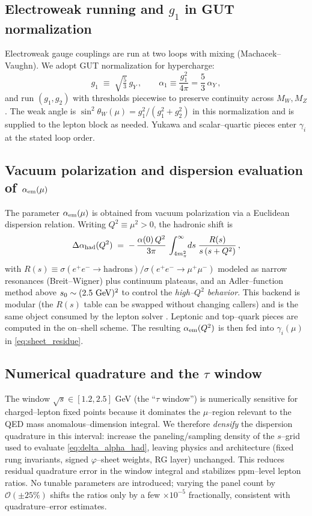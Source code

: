 \documentclass[%
  amsmath,amssymb,
  aps,
 prb,
 floatfix, showkeys
 ]{revtex4-2}
\begin{document}
 \subsection{Electroweak running and $g_1$ in GUT normalization}   %
 \label{subsec:ew_running}
 Electroweak gauge couplings are run at two loops with mixing (Machacek–Vaughn). We adopt GUT normalization for hypercharge:
 \[
   g_1 \;\equiv\; \sqrt{\tfrac{5}{3}}\,g_Y\,,\qquad \alpha_1 \equiv \frac{g_1^2}{4\pi}=\frac{5}{3}\,\alpha_Y\,,
 \]
 and run $(g_1,g_2)$ with thresholds piecewise to preserve continuity across $M_W,M_Z$. The weak angle is $\sin^2\theta_W(\mu) = g_1^2/(g_1^2+g_2^2)$ in this normalization and is supplied to the lepton block as needed. Yukawa and scalar–quartic pieces enter $\gamma_i$ at the stated loop order.
 
 \subsection{Vacuum polarization and dispersion evaluation of $\alpha_{\rm em}(\mu)$}  %
 \label{subsec:dispersion_alphaem}
 The parameter $\alpha_{\rm em}(\mu)$ is obtained from vacuum polarization via a Euclidean dispersion
 relation. Writing $Q^2\equiv\mu^2>0$, the hadronic shift is
 \begin{equation}
   \Delta\alpha_{\rm had}(Q^2) \;=\; -\,\frac{\alpha(0)\,Q^2}{3\pi}\,\int_{4m_\pi^2}^{\infty}\! ds\;\frac{R(s)}{s\,(s+Q^2)}\,,
   \label{eq:delta_alpha_had}
 \end{equation}
 with $R(s)\equiv \sigma(e^+e^-\!\to\!\text{hadrons})/\sigma(e^+e^-\!\to\!\mu^+\mu^-)$ modeled as narrow resonances (Breit–Wigner) plus continuum plateaus, and an Adler–function method above $s_0\sim(2.5~{\rm GeV})^2$ to control the \emph{high–$Q^2$ behavior}.
 This backend is modular (the $R(s)$ table can be swapped without changing callers) and is the same object consumed by the lepton solver \cite{EidelmanJegerlehner1995,Jegerlehner2003,Keshavarzi2019,Davier2017}.
 Leptonic and top–quark pieces are computed in the on–shell scheme. The resulting $\alpha_{\rm em}(Q^2)$ is then fed into $\gamma_i(\mu)$ in \eqref{eq:sheet_residue}.
 
 \subsection{Numerical quadrature and the $\tau$ window}
 \label{subsec:tau_window}
 The window $\sqrt{s}\in[1.2,2.5]$ GeV (the ``$\tau$ window'') is numerically sensitive
 for charged–lepton fixed points because it dominates the $\mu$–region relevant to the
 QED mass anomalous–dimension integral. We therefore \emph{densify} the dispersion quadrature
 in this interval: increase the paneling/sampling density of the $s$–grid used to
 evaluate \eqref{eq:delta_alpha_had}, leaving physics and architecture
 (fixed rung invariants, signed $\varphi$--sheet weights, RG layer) unchanged.
 This reduces residual quadrature error in the window integral and stabilizes
 ppm–level lepton ratios. No tunable parameters are introduced; varying the panel
 count by $\mathcal{O}(\pm 25\%)$ shifts the ratios only by a few $\times 10^{-5}$
 fractionally, consistent with quadrature–error estimates.
 
\end{document}
